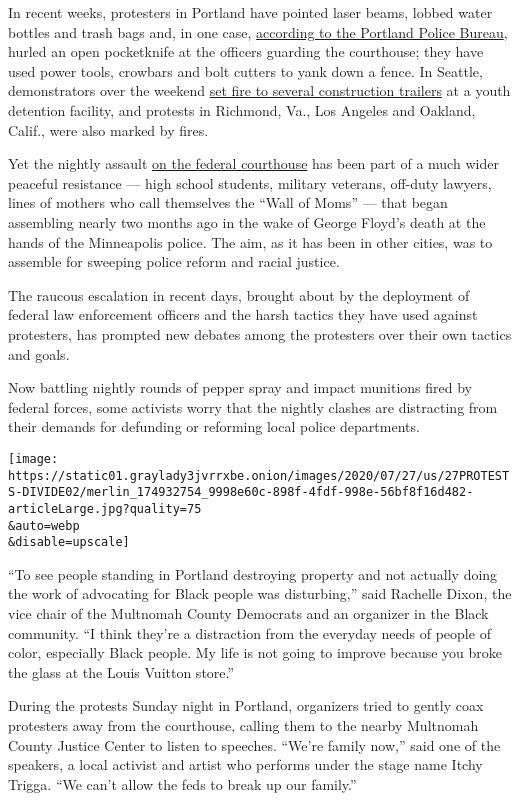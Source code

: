 In recent weeks, protesters in Portland have pointed laser beams, lobbed
water bottles and trash bags and, in one case,
\href{https://www.portlandoregon.gov/police/news/read.cfm?id=250945}{according
to the Portland Police Bureau}, hurled an open pocketknife at the
officers guarding the courthouse; they have used power tools, crowbars
and bolt cutters to yank down a fence. In Seattle, demonstrators over
the weekend
\href{https://www.nytimes3xbfgragh.onion/2020/07/25/us/protests-seattle-portland.html}{set
fire to several construction trailers} at a youth detention facility,
and protests in Richmond, Va., Los Angeles and Oakland, Calif., were
also marked by fires.

Yet the nightly assault
\href{https://www.nytimes3xbfgragh.onion/2020/07/22/us/portland-protests-courthouse.html}{on
the federal courthouse} has been part of a much wider peaceful
resistance --- high school students, military veterans, off-duty
lawyers, lines of mothers who call themselves the ``Wall of Moms'' ---
that began assembling nearly two months ago in the wake of George
Floyd's death at the hands of the Minneapolis police. The aim, as it has
been in other cities, was to assemble for sweeping police reform and
racial justice.

The raucous escalation in recent days, brought about by the deployment
of federal law enforcement officers and the harsh tactics they have used
against protesters, has prompted new debates among the protesters over
their own tactics and goals.

Now battling nightly rounds of pepper spray and impact munitions fired
by federal forces, some activists worry that the nightly clashes are
distracting from their demands for defunding or reforming local police
departments.

\texttt{[image: https://static01.graylady3jvrrxbe.onion/images/2020/07/27/us/27PROTESTS-DIVIDE02/merlin\_174932754\_9998e60c-898f-4fdf-998e-56bf8f16d482-articleLarge.jpg?quality=75\\\&auto=webp\\\&disable=upscale]}

``To see people standing in Portland destroying property and not
actually doing the work of advocating for Black people was disturbing,''
said Rachelle Dixon, the vice chair of the Multnomah County Democrats
and an organizer in the Black community. ``I think they're a distraction
from the everyday needs of people of color, especially Black people. My
life is not going to improve because you broke the glass at the Louis
Vuitton store.''

During the protests Sunday night in Portland, organizers tried to gently
coax protesters away from the courthouse, calling them to the nearby
Multnomah County Justice Center to listen to speeches. ``We're family
now,'' said one of the speakers, a local activist and artist who
performs under the stage name Itchy Trigga. ``We can't allow the feds to
break up our family.''

